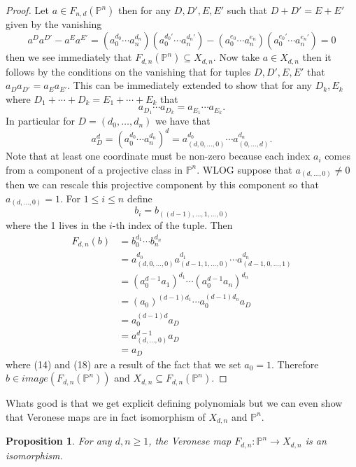 \documentclass[40pt]{article}
\newcommand{\Proj}{\mathbb{P}}
\newtheorem{proposition}{Proposition}[section]
\theoremstyle{remark}
\begin{document}
		\begin{proof}
			Let $a \in F_{n,d}(\Proj^n)$ then for any $D,D',E,E'$ such that $D + D' = E + E'$ given by the vanishing
			\[
			a^Da^{D'} - a^Ea^{E'} = (a_0^{d_0}\cdots a_n^{d_n})(a_0^{d_0'}\cdots a_n^{d_n'}) - (a_0^{e_0}\cdots a_n^{e_n})(a_0^{e_0'}\cdots a_n^{e_n'}) = 0
			\]
			then we see immediately that $F_{d,n}(\Proj^n) \subseteq X_{d,n}$. Now take $a \in X_{d,n}$ then it follows by the conditions on the vanishing that for tuples $D,D',E,E'$ that $a_Da_{D'} = a_Ea_{E'}$. This can be immediately extended to show that for any $D_k, E_k$ where $D_1 + \cdots + D_k = E_1 + \cdots +E_k$ that 
			\[
			a_{D_1}\cdots a_{D_k} = a_{E_1}\cdots a_{E_k}.
			\]
			In particular for $D = (d_0,\dots,d_n)$ we have that 
			\[
			a_D^d = (a_0^{d_0}\cdots a_n^{d_n})^d =a_{(d,0,\dots,0)}^{d_0}\cdots a_{(0,\dots,d)}^{d_n}.
			\]
			Note that at least one coordinate must be non-zero because each index $a_i$ comes from a component of a projective class in $\Proj^n$. WLOG suppose that $a_{(d,\dots,0)} \neq 0$ then we can rescale this projective component by this component so that $a_{(d,\dots,0)}  = 1$. For $1 \leq i \leq n$ define 
			\[
			b_i = b_{((d-1),\dots,1,\dots,0)}
			\]
			where the 1 lives in the $i$-th index of the tuple. Then 
			\begin{align}
				F_{d,n}(b) &= b_0^{d_1}\cdots b_n^{d_n} \\
				&= a_{(d,0,\dots,0)}^{d_0}a_{(d-1,1,\dots,0)}^{d_1}\cdots a_{(d-1,0,\dots,1)}^{d_n} \\
				&= (a_{0}^{d-1}a_1)^{d_1}\cdots (a_0^{d-1}a_n)^{d_n} \\
				&= (a_0)^{(d-1)d_1}\cdots a_0^{(d-1)d_n} a_D \\
				&= a_0^{(d-1)d}a_D \\
				&= a_{(d,\dots,0)}^{d-1}a_D\\
				&= a_D
			\end{align}
			where (14) and (18) are a result of the fact that we set $a_0 = 1$. Therefore $b \in image(F_{d,n}(\Proj^n))$ and $X_{d,n} \subseteq F_{d,n}(\Proj^n)$. 
		\end{proof}
		Whats good is that we get explicit defining polynomials but we can even show that Veronese maps are in fact isomorphism of $X_{d,n}$ and $\Proj^n$. 
		\begin{proposition}
			For any $d,n \geq 1$, the Veronese map $F_{d,n} : \Proj^n\rightarrow X_{d,n}$ is an isomorphism. 
		\end{proposition}
\end{document}
